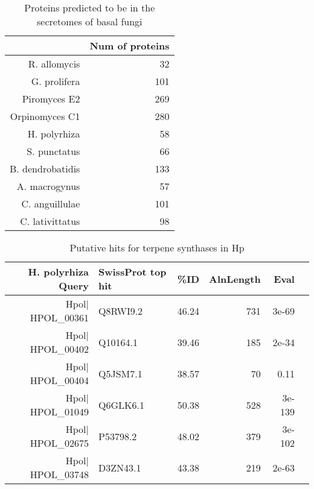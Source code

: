 \begin{table}[hp]
\caption[Chytrid secretome predictions]{Proteins predicted to be in the secretomes of basal fungi} 
\label{tab:ChInhib_ChySec}
\begin{tabular}{rr}
  \hline
 & Num of proteins \\ 
  \hline
R. allomycis &  32 \\ 
  G. prolifera & 101 \\ 
  Piromyces E2 & 269 \\ 
  Orpinomyces C1 & 280 \\ 
  H. polyrhiza &  58 \\ 
  S. punctatus &  66 \\ 
  B. dendrobatidis & 133 \\ 
  A. macrogynus &  57 \\ 
  C. anguillulae & 101 \\ 
  C. lativittatus &  98 \\ 
   \hline
\end{tabular}
\end{table}
\begin{table}[hp]
\caption[Putative Hp terpene synthases]{Putative hits for terpene synthases in Hp} 
\label{tab:ChInhib_Terpene}
\begin{tabular}{rlrrrl}
  \hline
 H. polyrhiza Query & SwissProt top hit & \%ID & AlnLength & Eval \\ 
  \hline
Hpol$|$HPOL\_00361 & Q8RWI9.2 & 46.24 & 731 & 3e-69  \\ 
  Hpol$|$HPOL\_00402 & Q10164.1 & 39.46 & 185 & 2e-34  \\ 
  Hpol$|$HPOL\_00404 & Q5JSM7.1 & 38.57 &  70 & 0.11  \\ 
  Hpol$|$HPOL\_01049 & Q6GLK6.1 & 50.38 & 528 & 3e-139  \\ 
  Hpol$|$HPOL\_02675 & P53798.2 & 48.02 & 379 & 3e-102  \\ 
  Hpol$|$HPOL\_03748 & D3ZN43.1 & 43.38 & 219 & 2e-63  \\ 
   \hline
\end{tabular}
\end{table}
